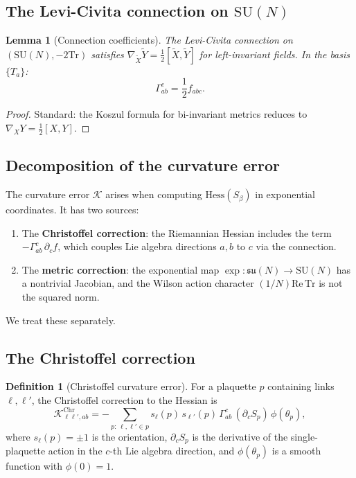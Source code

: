 \documentclass[11pt,a4paper]{article}
\theoremstyle{plain}
\newtheorem{lemma}[theorem]{Lemma}
\theoremstyle{definition}
\newtheorem{definition}[theorem]{Definition}
\theoremstyle{remark}
\newcommand{\SU}{\mathrm{SU}}
\newcommand{\su}{\mathfrak{su}}
\newcommand{\Tr}{\mathrm{Tr}}
\newcommand{\Hess}{\mathrm{Hess}}
\newcommand{\cK}{\mathcal{K}}
\begin{document}
\subsection{The Levi-Civita connection on $\SU(N)$}

\begin{lemma}[Connection coefficients]\label{lem:connection}
The Levi-Civita connection on $(\SU(N), -2\Tr)$ satisfies
$\nabla_{\tilde X}\tilde Y = \frac{1}{2}[\tilde X, \tilde Y]$
for left-invariant fields. In the basis $\{T_a\}$:
\begin{equation}
\Gamma^c_{ab} = \frac{1}{2}f_{abc}.
\end{equation}
\end{lemma}

\begin{proof}
Standard: the Koszul formula for bi-invariant metrics reduces to
$\nabla_X Y = \frac{1}{2}[X,Y]$.
\end{proof}


\subsection{Decomposition of the curvature error}

The curvature error $\cK$ arises when computing $\Hess(S_\beta)$
in exponential coordinates. It has two sources:

\begin{enumerate}[label=(\roman*)]
\item The \textbf{Christoffel correction}: the Riemannian Hessian
  includes the term $-\Gamma^c_{ab}\,\partial_c f$, which couples
  Lie algebra directions $a, b$ to $c$ via the connection.
\item The \textbf{metric correction}: the exponential map
  $\exp: \su(N) \to \SU(N)$ has a nontrivial Jacobian, and the
  Wilson action character $(1/N)\mathrm{Re}\,\Tr$ is not the
  squared norm.
\end{enumerate}

We treat these separately.


\subsection{The Christoffel correction}

\begin{definition}[Christoffel curvature error]
For a plaquette $p$ containing links $\ell, \ell'$, the
Christoffel correction to the Hessian is
\begin{equation}\label{eq:christoffel-def}
\cK^{\mathrm{Chr}}_{\ell\ell',ab}
= -\sum_{p:\,\ell,\ell' \in p} s_\ell(p)\,s_{\ell'}(p)\,
\Gamma^c_{ab}\,(\partial_c S_p)\,\phi(\theta_p),
\end{equation}
where $s_\ell(p) = \pm 1$ is the orientation, $\partial_c S_p$
is the derivative of the single-plaquette action in the $c$-th
Lie algebra direction, and $\phi(\theta_p)$ is a smooth function
with $\phi(0) = 1$.
\end{definition}
\end{document}
